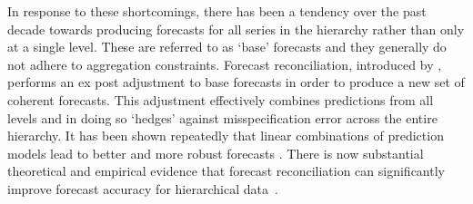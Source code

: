 \documentclass[a4paper,fleqn,11pt]{article}
\begin{document}
In response to these shortcomings, there has been a tendency over the past decade towards producing forecasts for all series in the hierarchy rather than only at a single level. These are referred to as `base' forecasts and they generally do not adhere to aggregation constraints. Forecast reconciliation, introduced by \cite{Hyndman2011}, performs an ex post adjustment to base forecasts in order to produce a new set of coherent forecasts. This adjustment effectively combines predictions from all levels and in doing so `hedges' against misspecification error across the entire hierarchy. It has been shown repeatedly that linear combinations of prediction models lead to better and more robust forecasts \citep[see, for instance,][]{Stock2006,Conflitti2015}. There is now substantial theoretical and empirical evidence that forecast reconciliation can significantly improve forecast accuracy for hierarchical data~\citep[see][and references therein]{Wickramasuriya2015}.
\end{document}
